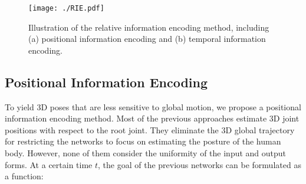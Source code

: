 \documentclass[sigconf]{acmart}
\begin{document}
\begin{figure}
  \centering
  \texttt{[image: ./RIE.pdf]}
  \vspace{-0.4cm}
  \caption{Illustration of the relative information encoding method, including (a) positional information encoding and (b) temporal information encoding. }
  \vspace{-0.3cm}
  \label{img11}
\end{figure}

\subsection{Positional Information Encoding}\label{P-ENH}
To yield 3D poses that are less sensitive to global motion, we propose a positional information encoding method. Most of the previous approaches \cite{liu2020attention,martinez2017simple,jllo20193d} estimate 3D joint positions with respect to the root joint. They eliminate the 3D global trajectory for restricting the networks to focus on estimating the posture of the human body. However, none of them consider the uniformity of the input and output forms. At a certain time ${t}$, the goal of the previous networks can be formulated as a function:
\end{document}
